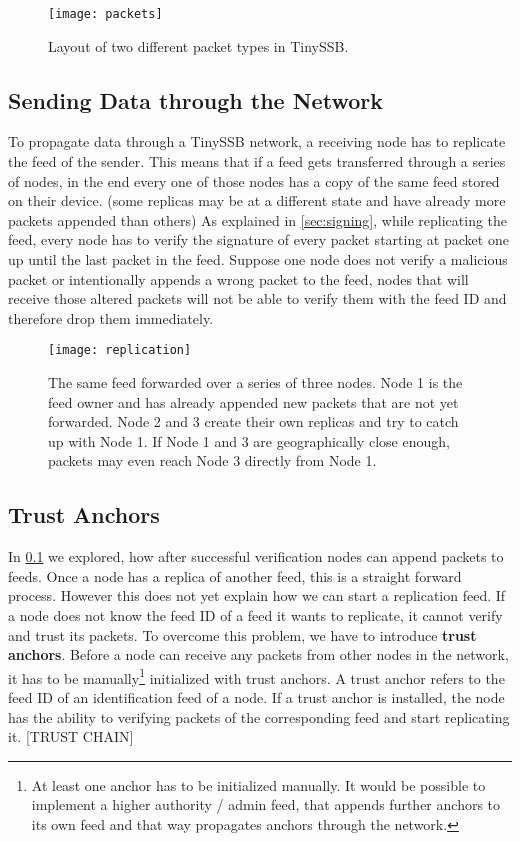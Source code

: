 \begin{figure}
\centering
\texttt{[image: packets]}
\caption{Layout of two different packet types in TinySSB.}
\label{fig:packets}
\end{figure}

\subsection{Sending Data through the Network}
\label{sec:sending}
To propagate data through a TinySSB network, a receiving node has to replicate the feed of the sender. This means that if a feed gets transferred through a series of nodes, in the end every one of those nodes has a copy of the same feed stored on their device. (some replicas may be at a different state and have already more packets appended than others) As explained in \cref{sec:signing}, while replicating the feed, every node has to verify the signature of every packet starting at packet one up until the last packet in the feed. Suppose one node does not verify a malicious packet or intentionally appends a wrong packet to the feed, nodes that will receive those altered packets will not be able to verify them with the feed ID and therefore drop them immediately.

\begin{figure}
\centering
\texttt{[image: replication]}
\caption{The same feed forwarded over a series of three nodes. Node 1 is the feed owner and has already appended new packets that are not yet forwarded. Node 2 and 3 create their own replicas and try to catch up with Node 1. If Node 1 and 3 are geographically close enough, packets may even reach Node 3 directly from Node 1.}
\label{fig:replication}
\end{figure}

\subsection{Trust Anchors}
In \cref{sec:sending} we explored, how after successful verification nodes can append packets to feeds. Once a node has a replica of another feed, this is a straight forward process. However this does not yet explain how we can start a replication feed. If a node does not know the feed ID of a feed it wants to replicate, it cannot verify and trust its packets. To overcome this problem, we have to introduce \textbf{trust anchors}. Before a node can receive any packets from other nodes in the network, it has to be manually\footnote{At least one anchor has to be initialized manually. It would be possible to implement a higher authority / admin feed, that appends further anchors to its own feed and that way propagates anchors through the network.} initialized with trust anchors. A trust anchor refers to the feed ID of an identification feed of a node. If a trust anchor is installed, the node has the ability to verifying packets of the corresponding feed and start replicating it. [TRUST CHAIN]

